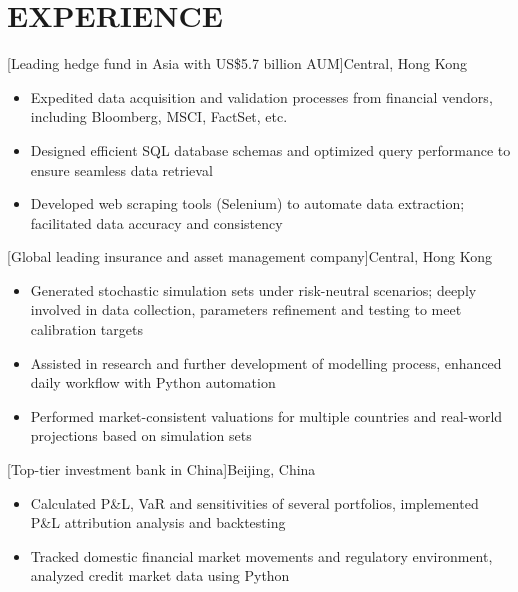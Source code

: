 \documentclass[cmu]{resume}
\begin{document}
    \section{EXPERIENCE}
    [Leading hedge fund in Asia with US\$5.7 billion AUM]{Central, Hong Kong}
    \begin{itemize}
        \item Expedited data acquisition and validation processes from financial vendors, including Bloomberg, MSCI, FactSet, etc.
        \item Designed efficient SQL database schemas and optimized query performance to ensure seamless data retrieval
        \item Developed web scraping tools (Selenium) to automate data extraction; facilitated data accuracy and consistency
    \end{itemize}

    [Global leading insurance and asset management company]{Central, Hong Kong}
    \begin{itemize}
        \item Generated stochastic simulation sets under risk-neutral scenarios; deeply involved in data collection, parameters refinement and testing to meet calibration targets
        \item Assisted in research and further development of modelling process, enhanced daily workflow with Python automation
        \item Performed market-consistent valuations for multiple countries and real-world projections based on simulation sets
    \end{itemize}

    [Top-tier investment bank in China]{Beijing, China}
    \begin{itemize}
        \item Calculated P\&L, VaR and sensitivities of several portfolios, implemented P\&L attribution analysis and backtesting
        \item Tracked domestic financial market movements and regulatory environment, analyzed credit market data using Python
    \end{itemize}
\end{document}
